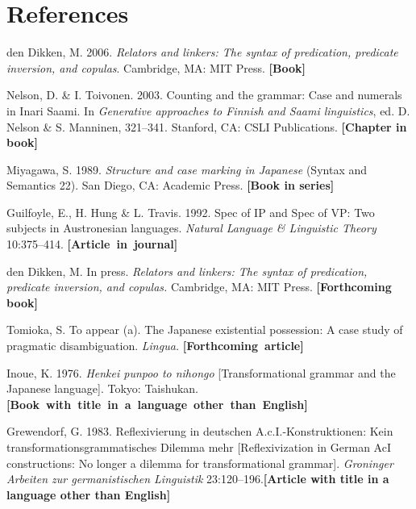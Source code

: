 \documentclass[letterpaper,12pt, twoside]{article}
\begin{document}

\section*{References}
\begin{list}{}{\leftmargin  0.25in
               \itemindent -0.25in \itemsep 0pt \parsep 0pt }

\item
den Dikken, M. 2006. \emph{Relators and linkers: The syntax of predication, predicate inversion, and copulas}. Cambridge, MA: MIT Press. {\footnotesize\bfseries \hfill [Book]}

\item Nelson, D. \& I. Toivonen. 2003. Counting and the grammar: Case and numerals in
Inari Saami. In \emph{Generative approaches to Finnish
and Saami linguistics}, ed. D. Nelson \& S. Manninen, 321--341. Stanford, CA: CSLI Publications.
{\footnotesize\bfseries \hfill [Chapter in book]}

\item
Miyagawa, S. 1989. \emph{Structure and case marking in Japanese} (Syntax and Semantics 22). San Diego, CA: Academic Press. {\footnotesize\bfseries \hfill [Book in series]}

\item
Guilfoyle, E., H. Hung \& L. Travis. 1992. Spec of IP and Spec of VP: Two subjects in Austronesian languages. \emph{Natural Language \& Linguistic Theory} 10:375--414. {\footnotesize\bfseries  \hfill \hbox{[Article in journal]}}

\item
den Dikken, M. In press. \emph{Relators and linkers: The syntax of predication, predicate inversion, and copulas.} Cambridge, MA: MIT Press.  {\footnotesize\bfseries \hfill [Forthcoming book]}

\item
Tomioka, S. To appear (a). The Japanese existential possession: A case study of pragmatic disambiguation. \emph{Lingua.}  \hfill {\footnotesize\bfseries\hbox{[Forthcoming article]}}

\item
Inoue, K. 1976. \emph{Henkei punpoo to nihongo} [Transformational grammar and the Japanese language]. Tokyo: Taishukan.  {\footnotesize\bfseries \hfill \hbox{[Book with title in a language other than English]}}

\item
Grewendorf, G. 1983. Reflexivierung in deutschen A.c.I.-Konstruktionen: Kein transformationsgrammatisches Dilemma mehr [Reflexivization in German AcI constructions: No longer a dilemma for transformational grammar]. \emph{Groninger Arbeiten zur germanistischen Linguistik} 23:120--196.{\footnotesize\bfseries \hfill [Article with title in a language other than English]}


\end{list}
\end{document}
